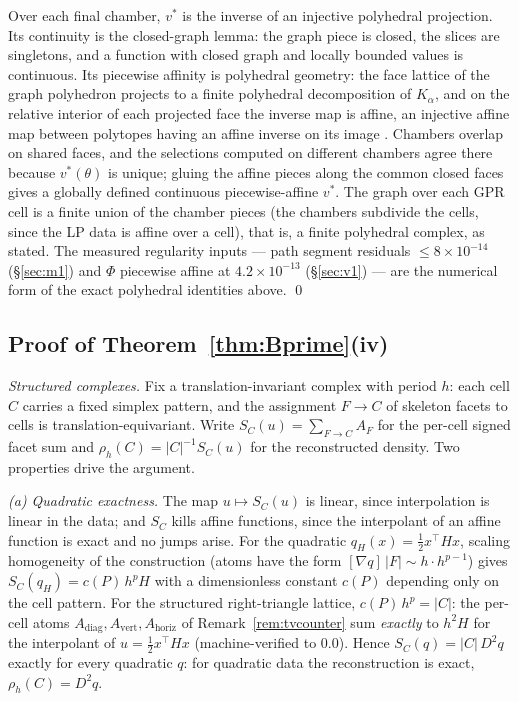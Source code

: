 \documentclass[11pt,a4paper]{article}
\theoremstyle{plain}
\theoremstyle{definition}
\theoremstyle{remark}
\begin{document}
Over each final chamber, $v^{*}$ is the inverse of an injective
polyhedral projection. Its continuity is the closed-graph lemma: the
graph piece is closed, the slices are singletons, and a function
with closed graph and locally bounded values is continuous. Its
piecewise affinity is polyhedral geometry: the face lattice of the
graph polyhedron projects to a finite polyhedral decomposition of
$K_{\alpha}$, and on the relative interior of each projected face
the inverse map is affine, an injective affine map between polytopes
having an affine inverse on its image \citep{ziegler1995}. Chambers
overlap on shared faces, and the selections computed on different
chambers agree there because $v^{*}(\theta)$ is unique; gluing the
affine pieces along the common closed faces gives a globally
defined continuous piecewise-affine $v^{*}$. The graph over each GPR
cell is a finite union of the chamber pieces (the chambers subdivide
the cells, since the LP data is affine over a cell), that is, a
finite polyhedral complex, as stated. The measured regularity inputs
--- path segment residuals $\le 8 \times 10^{-14}$
(\S\ref{sec:m1}) and $\Phi$ piecewise affine at $4.2 \times
10^{-13}$ (\S\ref{sec:v1}) --- are the numerical form of the exact
polyhedral identities above. \qed

\subsection{Proof of Theorem~\ref{thm:Bprime}(iv)}

\emph{Structured complexes.} Fix a translation-invariant complex
with period $h$: each cell $C$ carries a fixed simplex pattern, and
the assignment $F \to C$ of skeleton facets to cells is
translation-equivariant. Write $S_C(u) = \sum_{F \to C} A_F$ for the
per-cell signed facet sum and $\rho_h(C) = |C|^{-1}S_C(u)$ for the
reconstructed density. Two properties drive the argument.

\emph{(a) Quadratic exactness.} The map $u \mapsto S_C(u)$ is
linear, since interpolation is linear in the data; and $S_C$ kills
affine functions, since the interpolant of an affine function is
exact and no jumps arise. For the quadratic $q_H(x) = \tfrac12
x^{\top}Hx$, scaling homogeneity of the construction (atoms have the
form $[\nabla q]\,|F| \sim h \cdot h^{p-1}$) gives $S_C(q_H) = c(P)\,
h^{p} H$ with a dimensionless constant $c(P)$ depending only on the
cell pattern. For the structured right-triangle lattice,
$c(P)\,h^{p} = |C|$: the per-cell atoms
$A_{\mathrm{diag}}, A_{\mathrm{vert}}, A_{\mathrm{horiz}}$ of
Remark~\ref{rem:tvcounter} sum \emph{exactly} to $h^{2}H$ for the
interpolant of $u = \tfrac12 x^{\top}Hx$ (machine-verified to
$0.0$). Hence $S_C(q) = |C|\,D^{2}q$ exactly for every quadratic
$q$: for quadratic data the reconstruction is exact,
$\rho_h(C) = D^{2}q$.
\end{document}
